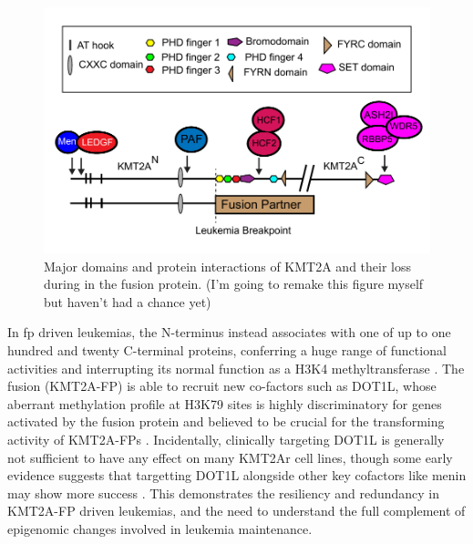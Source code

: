 \begin{figure}
    \centering
    \includegraphics[width=\textwidth]{plot/ch5/MLL schematic.pdf}
    \caption{Major domains and protein interactions of KMT2A and their loss during in the fusion protein. (I'm going to remake this figure myself but haven't had a chance yet)}
    \label{fig:mll_fig}
\end{figure}


In \gls{fp} driven leukemias, the N-terminus instead associates with one of up to one hundred and twenty C-terminal proteins, conferring a huge range of functional activities and interrupting its normal function as a H3K4 methyltransferase \cite{Hsieh2003}. 
The fusion (KMT2A-FP) is able to recruit new co-factors such as DOT1L, whose aberrant methylation profile at H3K79 sites is highly discriminatory for genes activated by the fusion protein and believed to be crucial for the transforming activity of KMT2A-FPs \cite{YOkada2005, KMBernt2011}. Incidentally, clinically targeting DOT1L is generally not sufficient to have any effect on many KMT2Ar cell lines, though some early evidence suggests that targetting DOT1L alongside other key cofactors like menin may show more success \cite{Dafflon2016}. This demonstrates the resiliency and redundancy in KMT2A-FP driven leukemias, and the need to understand the full complement of epigenomic changes involved in leukemia maintenance.  


